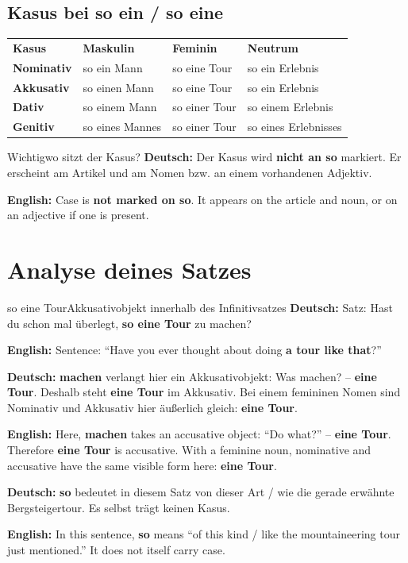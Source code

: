 \documentclass[a4paper,11pt]{article}
\newcommand{\GermanText}[1]{\textbf{Deutsch: }#1\par}
\newcommand{\EnglishText}[1]{{\small\color{SoftGray}\textbf{English: }#1\par}}
\begin{document}
        \subsection{Kasus bei \glqq so ein / so eine\grqq}

        \begin{longtable}{>{\bfseries}p{2.4cm}|p{3.3cm}|p{3.3cm}|p{3.3cm}}
            \rowcolor{HeaderBlueDark}
            \color{white}\textbf{Kasus} &
            \color{white}\textbf{Maskulin} &
            \color{white}\textbf{Feminin} &
            \color{white}\textbf{Neutrum} \\
            Nominativ & so ein Mann & so eine Tour & so ein Erlebnis \\
            Akkusativ & so einen Mann & so eine Tour & so ein Erlebnis \\
            Dativ & so einem Mann & so einer Tour & so einem Erlebnis \\
            Genitiv & so eines Mannes & so einer Tour & so eines Erlebnisses \\
        \end{longtable}

        \begin{grammarentry}{Wichtig}{wo sitzt der Kasus?}
            \GermanText{Der Kasus wird \textbf{nicht an so} markiert. Er erscheint am Artikel und am Nomen bzw. an einem vorhandenen Adjektiv.}
            \EnglishText{Case is \textbf{not marked on so}. It appears on the article and noun, or on an adjective if one is present.}
        \end{grammarentry}

    \section{Analyse deines Satzes}

        \begin{grammarentry}{so eine Tour}{Akkusativobjekt innerhalb des Infinitivsatzes}
            \GermanText{Satz: \glqq Hast du schon mal überlegt, \textbf{so eine Tour} zu machen?\grqq}
            \EnglishText{Sentence: ``Have you ever thought about doing \textbf{a tour like that}?''}

            \GermanText{\textbf{machen} verlangt hier ein Akkusativobjekt: \glqq Was machen?\grqq{} -- \textbf{eine Tour}. Deshalb steht \textbf{eine Tour} im Akkusativ. Bei einem femininen Nomen sind Nominativ und Akkusativ hier äußerlich gleich: \textbf{eine Tour}.}
            \EnglishText{Here, \textbf{machen} takes an accusative object: ``Do what?'' -- \textbf{eine Tour}. Therefore \textbf{eine Tour} is accusative. With a feminine noun, nominative and accusative have the same visible form here: \textbf{eine Tour}.}

            \GermanText{\textbf{so} bedeutet in diesem Satz \glqq von dieser Art / wie die gerade erwähnte Bergsteigertour\grqq. Es selbst trägt keinen Kasus.}
            \EnglishText{In this sentence, \textbf{so} means ``of this kind / like the mountaineering tour just mentioned.'' It does not itself carry case.}
        \end{grammarentry}
\end{document}
